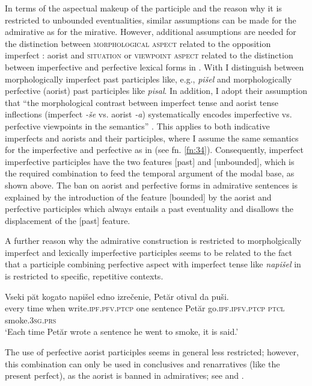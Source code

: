 \documentclass[output=paper]{langscibook}
\begin{document}
In terms of the aspectual makeup of the participle and the reason why it is restricted to unbounded eventualities, similar assumptions can be made for the  admirative as for the  mirative. However, additional assumptions are needed for the distinction between \textsc{morphological aspect} related to the opposition imperfect : aorist and \textsc{situation} or \textsc{viewpoint aspect} related to the distinction between imperfective and perfective lexical forms in . With \citet{Rivero.Slavkov2014} I distinguish between morphologically imperfect past participles like, e.g., \textit{pišel} and morphologically perfective (aorist) past participles like \textit{pisal}. In addition, I adopt their assumption that ``the morphological contrast between imperfect tense and aorist tense inflections (imperfect \textit{-še} vs. aorist \textit{-a}) systematically encodes imperfective vs. perfective viewpoints in the semantics'' \citep[235]{Rivero.Slavkov2014}. This applies to both indicative imperfects and aorists and their participles, where I assume the same semantics for the imperfective and perfective as in \citeauthor{Bustamante2013} (see fn. \ref{fn:34}). Consequently,  imperfect imperfective participles have the two features [past] and [unbounded], which is the required combination to feed the temporal argument of the modal base, as shown above. The ban on aorist and perfective forms in admirative sentences is explained by the introduction of the feature [bounded] by the aorist and perfective participles which always entails a past eventuality and disallows the displacement of the [past] feature.

A further reason why the  admirative construction is restricted to morpholgically imperfect and lexically imperfective participles seems to be related to the fact that a participle combining perfective aspect with imperfect tense like \textit{napišel} in  is restricted to specific, repetitive contexts.

\ea\label{ex:napisel}
\gll Vseki păt kogato napišel edno izrečenie, Petăr otival da puši.\\
every time when write.\textsc{ipf.pfv.ptcp} one sentence Petăr go.\textsc{ipf.ipfv.ptcp} \textsc{ptcl} smoke.\textsc{3sg.prs}\\
\glt `Each time Petăr wrote a sentence he went to smoke, it is said.'
\z

\noindent The use of perfective aorist participles seems in general less restricted; however, this combination can only be used in conclusives and renarratives (like the present perfect), as the aorist is banned in admiratives; see  and .
\end{document}
